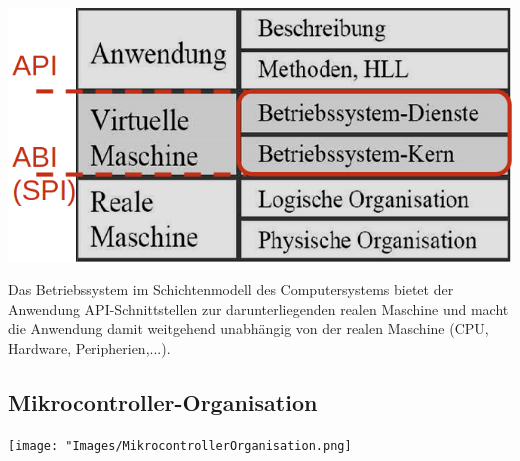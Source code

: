 \begin{center}
	\includegraphics[width=.6\linewidth]{"Images/Schichtmodell.png"}
\end{center}

Das Betriebssystem im Schichtenmodell des Computersystems bietet der Anwendung API-Schnittstellen zur darunterliegenden realen Maschine und macht die Anwendung damit weitgehend unabhängig von der realen Maschine (CPU, Hardware, Peripherien,...).

\subsection{Mikrocontroller-Organisation}

\texttt{[image: "Images/MikrocontrollerOrganisation.png]}